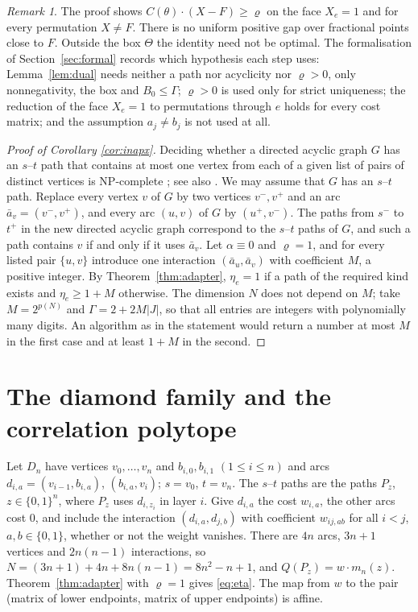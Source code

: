 \documentclass[11pt]{amsart}
\theoremstyle{plain}
\theoremstyle{definition}
\theoremstyle{remark}
\newtheorem{remark}[theorem]{Remark}
\begin{document}
\begin{remark}\label{rem:gap}
The proof shows $C(\theta)\cdot(X-F)\ge\varrho$ on the face $X_e=1$ and for every permutation $X\ne F$. There is no
uniform positive gap over fractional points close to $F$. Outside the box $\Theta$ the identity need not be optimal.
The formalisation of Section~\ref{sec:formal} records which hypothesis each step uses: Lemma~\ref{lem:dual} needs
neither a path nor acyclicity nor $\varrho>0$, only nonnegativity, the box and $B_0\le\Gamma$; $\varrho>0$ is used
only for strict uniqueness; the reduction of the face $X_e=1$ to permutations through $e$ holds for every cost
matrix; and the assumption $a_j\ne b_j$ is not used at all.
\end{remark}

\begin{proof}[Proof of Corollary \ref{cor:inapx}]
Deciding whether a directed acyclic graph $G$ has an $s$--$t$ path that contains at most one vertex from each of
a given list of pairs of distinct vertices is NP-complete \cite{GMO}; see also \cite{Kovac}. We may assume that $G$ has an
$s$--$t$ path. Replace every vertex $v$ of $G$ by two vertices $v^-,v^+$ and an arc $\bar a_v=(v^-,v^+)$, and
every arc $(u,v)$ of $G$ by $(u^+,v^-)$. The paths from $s^-$ to $t^+$ in the new directed acyclic graph correspond
to the $s$--$t$ paths of $G$, and such a path contains $v$ if and only if it uses $\bar a_v$. Let $\alpha\equiv0$
and $\varrho=1$, and for every listed pair $\{u,v\}$ introduce one interaction $(\bar a_u,\bar a_v)$ with
coefficient $M$, a positive integer. By Theorem~\ref{thm:adapter}, $\eta_e=1$ if a path of the required kind
exists and $\eta_e\ge1+M$ otherwise. The dimension $N$ does not depend on $M$; take $M=2^{p(N)}$ and
$\Gamma=2+2M|J|$, so that all entries are integers with polynomially many digits. An algorithm as in the statement
would return a number at most $M$ in the first case and at least $1+M$ in the second.
\end{proof}

\section{The diamond family and the correlation polytope}\label{sec:diamond}

Let $D_n$ have vertices $v_0,\dots,v_n$ and $b_{i,0},b_{i,1}$ $(1\le i\le n)$ and arcs
$d_{i,a}=(v_{i-1},b_{i,a})$, $(b_{i,a},v_i)$; $s=v_0$, $t=v_n$. The $s$--$t$ paths are the paths $P_z$, $z\in\{0,1\}^n$, where $P_z$ uses $d_{i,z_i}$ in layer
$i$. Give
$d_{i,a}$ the cost $w_{i,a}$, the other arcs cost $0$, and include the interaction $(d_{i,a},d_{j,b})$ with
coefficient $w_{ij,ab}$ for all $i<j$, $a,b\in\{0,1\}$, whether or not the weight vanishes. There are $4n$ arcs,
$3n+1$ vertices and $2n(n-1)$ interactions, so $N=(3n+1)+4n+8n(n-1)=8n^2-n+1$, and $Q(P_z)=w\cdot m_n(z)$.
Theorem~\ref{thm:adapter} with $\varrho=1$ gives \eqref{eq:eta}. The map from $w$ to the pair (matrix of lower
endpoints, matrix of upper endpoints) is affine.
\end{document}
